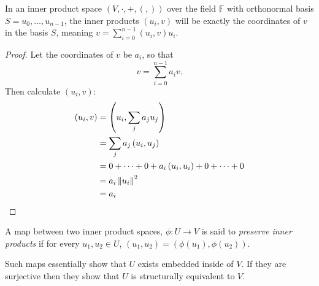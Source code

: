 \begin{prop}\label{coords-inner-product}
	In an inner product space $(V, \cdot, +, (,))$ over the field $\mathbb{F}$ with orthonormal basis $S={u_0, \dots, u_{n-1}}$, the inner products $(u_i, v)$ will be exactly the coordinates of $v$ in the basis $S$, meaning $v = \sum_{i=0}^{n-1} (u_i,v)u_i$.
\end{prop}
\begin{proof}
	Let the coordinates of $v$ be $a_i$, so that
	\[v = \sum_{i=0}^{n-1}a_iv.\]
	Then calculate $(u_i, v)$:
	\begin{align*}
		(u_i, v)
		&= \left(u_i, \sum_j a_ju_j\right)
		\\&= \sum_j a_j\left(u_i, u_j\right)
		\\&= 0 + \dots + 0 + a_i\left(u_i, u_i\right) + 0 + \dots + 0
		\\&= a_i\left\Vert u_i \right\Vert^2
		\\&= a_i
	\end{align*}
\end{proof}

\begin{define}
	A map between two inner product spaces, $\phi: U \to V$ is said to \emph{preserve inner products} if for every $u_1, u_2 \in U$, $(u_1, u_2) = (\phi(u_1), \phi(u_2))$.
\end{define}

Such maps essentially show that $U$ exists embedded inside of $V$. If they are surjective then they show that $U$ is structurally equivalent to $V$.

